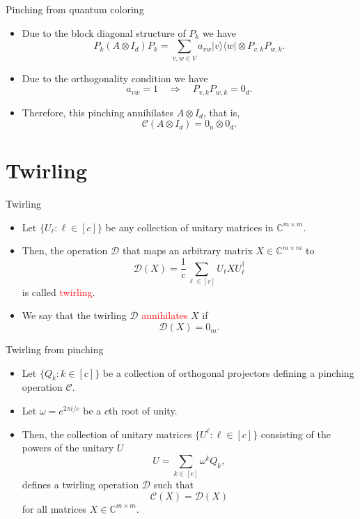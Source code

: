 \documentclass{beamer}
\newcommand{\C}{\mathbb{C}}
\newcommand{\cC}{\mathcal{C}}
\newcommand{\cD}{\mathcal{D}}
\renewcommand{\>}{\rangle}
\newcommand{\<}{\langle}
\begin{document}
%

\begin{frame}{Pinching from quantum coloring}
\begin{itemize}
\item Due to the block diagonal structure of $P_k$ we have
\[
P_k (A\otimes I_d) P_k =
\sum_{v,w\in V} a_{vw} |v\>\<w| \otimes P_{v,k} P_{w,k}.
\]
\item Due to the orthogonality condition we have
\[
a_{vw}=1 \quad \Rightarrow \quad P_{v,k} P_{w,k} = 0_d.
\]

\item Therefore, this pinching annihilates $A\otimes I_d$, that is, 
\[
\cC(A\otimes I_d) = 0_n \otimes 0_d.
\]

\end{itemize}
\end{frame}

%

\section{Twirling}

\begin{frame}{Twirling}
\begin{itemize}
\item Let $\{U_\ell : \ell\in [c]\}$ be any collection of unitary matrices in $\C^{m\times m}$.

\item Then, the operation $\cD$ that maps an arbitrary matrix $X\in\C^{m\times m}$ to
\[
\cD(X) = \frac{1}{c} \sum_{\ell\in [c]} U_\ell X U_\ell^\dagger
\]
is called \textcolor{red}{twirling}.

\item We say that the twirling $\cD$ \textcolor{red}{annihilates} $X$ if
\[
\cD(X) = 0_m.
\]
\end{itemize}

\end{frame}

%

\begin{frame}{Twirling from pinching}

\begin{itemize}
\item Let $\{Q_k : k\in [c]\}$ be a collection of orthogonal projectors defining a pinching operation $\cC$.

\item Let $\omega = e^{2 \pi i /c}$ be a $c$th root of unity.

\item Then, the collection of unitary matrices $\{ U^\ell : \ell \in [c]\}$ consisting of the powers of the unitary $U$
\[
U = \sum_{k\in [c]} \omega^{k} Q_k,
\]
defines a twirling operation $\cD$ such that
\[
\cC(X) = \cD(X) 
\]
for all  matrices $X\in\C^{m\times m}$.

\end{itemize}

\end{frame}
\end{document}
